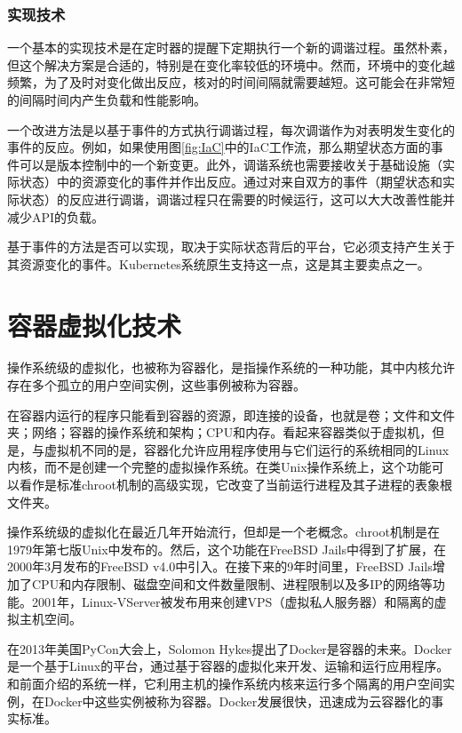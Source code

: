 \documentclass[macfonts,master]{njuthesis}
\begin{document}
\subsubsection{实现技术}

一个基本的实现技术是在定时器的提醒下定期执行一个新的调谐过程。虽然朴素，但这个解决方案是合适的，特别是在变化率较低的环境中。然而，环境中的变化越频繁，为了及时对变化做出反应，核对的时间间隔就需要越短。这可能会在非常短的间隔时间内产生负载和性能影响。

一个改进方法是以基于事件的方式执行调谐过程，每次调谐作为对表明发生变化的事件的反应。例如，如果使用图\ref{fig:IaC}中的IaC工作流，那么期望状态方面的事件可以是版本控制中的一个新变更。此外，调谐系统也需要接收关于基础设施（实际状态）中的资源变化的事件并作出反应。通过对来自双方的事件（期望状态和实际状态）的反应进行调谐，调谐过程只在需要的时候运行，这可以大大改善性能并减少API的负载。

基于事件的方法是否可以实现，取决于实际状态背后的平台，它必须支持产生关于其资源变化的事件。Kubernetes系统原生支持这一点，这是其主要卖点之一。


\section{容器虚拟化技术}
操作系统级的虚拟化，也被称为容器化，是指操作系统的一种功能，其中内核允许存在多个孤立的用户空间实例，这些事例被称为容器。

在容器内运行的程序只能看到容器的资源，即连接的设备，也就是卷；文件和文件夹；网络；容器的操作系统和架构；CPU和内存。看起来容器类似于虚拟机，但是，与虚拟机不同的是，容器化允许应用程序使用与它们运行的系统相同的Linux内核，而不是创建一个完整的虚拟操作系统。在类Unix操作系统上，这个功能可以看作是标准chroot机制的高级实现，它改变了当前运行进程及其子进程的表象根文件夹。

操作系统级的虚拟化在最近几年开始流行，但却是一个老概念。chroot机制是在1979年第七版Unix中发布的。然后，这个功能在FreeBSD Jails中得到了扩展，在2000年3月发布的FreeBSD v4.0中引入。在接下来的9年时间里，FreeBSD Jails增加了CPU和内存限制、磁盘空间和文件数量限制、进程限制以及多IP的网络等功能。2001年，Linux-VServer被发布用来创建VPS（虚拟私人服务器）和隔离的虚拟主机空间。

在2013年美国PyCon大会上，Solomon Hykes提出了Docker是容器的未来。Docker是一个基于Linux的平台，通过基于容器的虚拟化来开发、运输和运行应用程序。和前面介绍的系统一样，它利用主机的操作系统内核来运行多个隔离的用户空间实例，在Docker中这些实例被称为容器。Docker发展很快，迅速成为云容器化的事实标准\cite{cloudcontainertech}。
\end{document}
